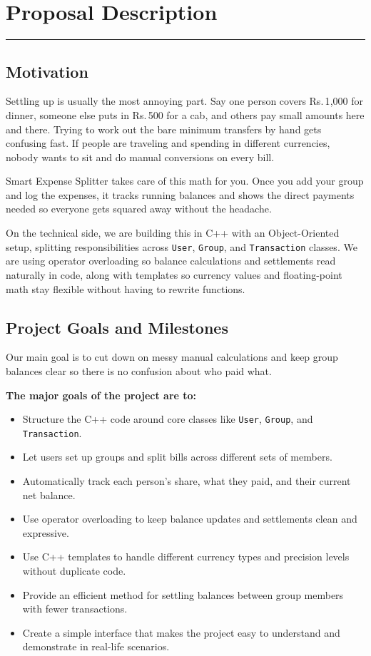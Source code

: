 \documentclass[11pt,a4paper]{article}
\begin{document}
\clearpage

\section*{Proposal Description}
\noindent\rule{\linewidth}{0.8pt}

\subsection*{Motivation}

Settling up is usually the most annoying part. Say one person covers Rs.\,1{,}000 for dinner, someone else puts in Rs.\,500 for a cab, and others pay small amounts here and there. Trying to work out the bare minimum transfers by hand gets confusing fast. If people are traveling and spending in different currencies, nobody wants to sit and do manual conversions on every bill.

Smart Expense Splitter takes care of this math for you. Once you add your group and log the expenses, it tracks running balances and shows the direct payments needed so everyone gets squared away without the headache.

On the technical side, we are building this in C++ with an Object-Oriented setup, splitting responsibilities across \texttt{User}, \texttt{Group}, and \texttt{Transaction} classes. We are using operator overloading so balance calculations and settlements read naturally in code, along with templates so currency values and floating-point math stay flexible without having to rewrite functions.

\subsection*{Project Goals and Milestones}

Our main goal is to cut down on messy manual calculations and keep group balances clear so there is no confusion about who paid what.

\medskip
\noindent\textbf{The major goals of the project are to:}
\begin{itemize}[leftmargin=1.5em]
  \item Structure the C++ code around core classes like \texttt{User}, \texttt{Group}, and \texttt{Transaction}.
  \item Let users set up groups and split bills across different sets of members.
  \item Automatically track each person's share, what they paid, and their current net balance.
  \item Use operator overloading to keep balance updates and settlements clean and expressive.
  \item Use C++ templates to handle different currency types and precision levels without duplicate code.
  \item Provide an efficient method for settling balances between group members with fewer transactions.
  \item Create a simple interface that makes the project easy to understand and demonstrate in real-life scenarios.
\end{itemize}
\end{document}
